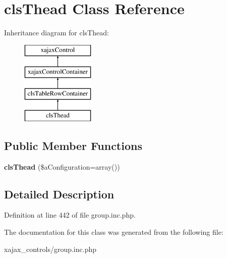 \hypertarget{classclsThead}{
\section{clsThead Class Reference}
\label{classclsThead}
}
Inheritance diagram for clsThead:\begin{figure}[H]
\begin{center}
\leavevmode
\includegraphics[height=4.000000cm]{classclsThead}
\end{center}
\end{figure}
\subsection*{Public Member Functions}
\begin{DoxyCompactItemize}
\item 
\hypertarget{classclsThead_ad1958ad63883d42d0006bba4035c8700}{
{\bfseries clsThead} (\$aConfiguration=array())}
\label{classclsThead_ad1958ad63883d42d0006bba4035c8700}

\end{DoxyCompactItemize}


\subsection{Detailed Description}


Definition at line 442 of file group.inc.php.



The documentation for this class was generated from the following file:\begin{DoxyCompactItemize}
\item 
xajax\_\-controls/group.inc.php\end{DoxyCompactItemize}
